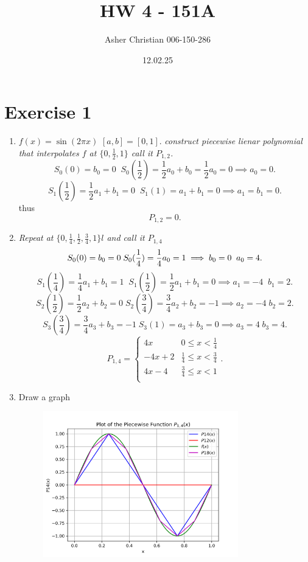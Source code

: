 \documentclass{amsart}
\title{HW 4 - 151A}
\author{Asher Christian 006-150-286}
\date{ 12.02.25}
\begin{document}
    \maketitle
    \section{Exercise 1}
    \begin{enumerate}[label = (\alph*)]
        \item $f(x) = \sin(2\pi x)$ $[a,b] = [0,1]$. \emph{ construct piecewise lienar polynomial
            that interpolates $f$ at $\{0,\frac{1}{2},1\}$ call it $P_{1,2}$.}\\
            \[
            S_0(0) = b_0 = 0 \;\; S_0(\frac{1}{2}) = \frac{1}{2}a_0 + b_0 = \frac{1}{2}a_0 = 0 \implies a_0 = 0
            .\] 
            \[
            S_1(\frac{1}{2}) = \frac{1}{2}a_1 + b_1 = 0 \;\; S_1(1) = a_1 + b_1 = 0 \implies a_1=b_1=0
            .\] 
            thus
            \[
                P_{1,2} = 0
            .\] 
        \item \emph{Repeat at $\{0,\frac{1}{4},\frac{1}{2},\frac{3}{4},1\}l$ and call it $P_{1,4}$}
             \[
            S_0(0) = b_0 = 0 \; S_0(\frac{1}{4}) = \frac{1}{4}a_0 = 1 \implies b_0 = 0 \;\; a_0 = 4\\
            .\] 
            \[
            S_1(\frac{1}{4}) = \frac{1}{4}a_1 + b_1 = 1 \;\; S_1(\frac{1}{2}) = \frac{1}{2}a_1 + b_1 = 0 \implies a_1 = -4 \;\; b_1 =2
            .\] 
            \[
            S_2(\frac{1}{2}) = \frac{1}{2}a_2 + b_2 = 0 \; S_2(\frac{3}{4}) = \frac{3}{4}a_2 + b_2 = -1 \implies a_2 = -4 \; b_2 = 2
            .\] 
            \[
            S_3(\frac{3}{4}) = \frac{3}{4}a_3 + b_3 = -1 \; S_3(1) = a_3 + b_3 = 0 \implies a_3 = 4 \; b_3 = 4
            .\] 
            \[
                P_{1,4} =
                \begin{cases}
                    4x & 0 \le x < \frac{1}{4}\\
                    -4x + 2 & \frac{1}{4} \le x < \frac{3}{4}\\
                    4x -4 & \frac{3}{4} \le x < 1\\
                \end{cases}
            .\] 
        \item Draw a graph
            \begin{figure}[h]
                \centering
                \includegraphics[width=0.8\textwidth]{plot.png}

\end{figure}
\end{enumerate}
\end{document}

